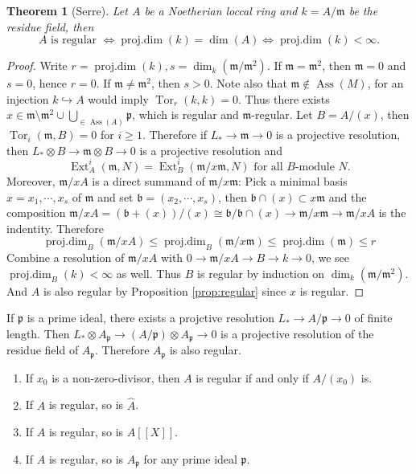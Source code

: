 \documentclass[leqno]{amsart}
\DeclareMathOperator{\Ass}{Ass}
\DeclareMathOperator{\prd}{proj.dim}
\newcommand{\1}{\mathbf{1}}
\newcommand{\fm}{\mathfrak m}
\newcommand{\fp}{\mathfrak p}
\DeclareMathOperator{\Ext}{Ext}
\DeclareMathOperator{\Tor}{Tor}
\newtheorem{thm}{Theorem}[section]
\theoremstyle{definition}
\theoremstyle{remark}
\begin{document}
\begin{thm}[Serre]
	Let $A$ be a Noetherian loccal ring
	and $k=A/\fm$ be the residue field, then
	\[
		A \text{ is regular } \Longleftrightarrow
		\prd(k)=\dim(A) \Longleftrightarrow
		\prd(k)<\infty.
	\]
\end{thm}
\begin{proof}
	Write $r=\prd(k), s=\dim_k(\fm/\fm^2)$.
	If $\fm=\fm^2$, then $\fm=0$ and $s=0$, hence  $r=0$.
	If $\fm\neq \fm^2$, then  $s>0$.
	Note also that  $\fm\notin\Ass(M)$,
	for an injection $k\hookrightarrow A$ 
	would imply $\Tor_r(k,k)=0$.
	Thus there exists 
	$x\in \fm\setminus \fm^2\cup\bigcup_{\in \Ass(A)}\fp$,
	which is regular and $\fm$-regular.
	Let $B=A/(x)$, then
	$\Tor_i(\fm,B)=0$ for  $i\geq 1$.
	Therefore if $L_*\to \fm\to 0$ is a projective resolution,
	then  $L_*\otimes B\to \fm\otimes B\to 0$
	is a projective resolution and
	\[
		\Ext_A^i(\fm,N)=\Ext_B^i(\fm/x\fm, N) 
		\text{ for all $B$-module $N$.}
	\]
	Moreover, $\fm/xA$ is a direct summand of  $\fm/x\fm$:
	Pick a minimal basis $x=x_1,\cdots,x_s$ of $\fm$
	and set $\mathfrak{b}=(x_2,\cdots,x_s)$,
	then $\mathfrak{b}\cap (x)\subset x\fm$ and 
	the composition 
	$\fm/xA=(\mathfrak{b}+(x))/(x)\cong 
	\mathfrak{b}/\mathfrak{b}\cap (x)\to
	\fm/x\fm\to \fm/xA$ is the indentity.
	Therefore
	\[
		\prd_B(\fm/xA)\leq \prd_B(\fm/x\fm)
		\leq \prd(\fm)\leq r
	\]
	Combine a resolution of $\fm/xA$
	with $0\to \fm/xA\to B\to k\to 0$,
	we see $\prd_B(k)<\infty$ as well.
	Thus $B$ is regular by induction on 
	$\dim_k(\fm/\fm^2)$.
	And  $A$ is also regular by Proposition \ref{prop:regular}
	since $x$ is regular.
\end{proof}

If $\fp$ is a prime ideal,
there exists a projctive resolution
$L_*\to A/\fp\to 0$ of finite length.
Then $L_*\otimes A_\fp\to (A/\fp)\otimes A_\fp\to 0$
is a projective resolution of the residue field of $A_\fp$.
Therefore  $A_\fp$ is also regular.

\begin{enumerate}
	\item If $x_0$ is a non-zero-divisor, then
		 $A$ is regular if and only if 
		 $A/(x_0)$ is.
	 \item If $A$ is regular, so is $\hat{A}$.
	 \item If $A$ is regular, so is $A[[X]]$.
	 \item If $A$ is regular, so is $A_\fp$
		 for any prime ideal $\fp$.
\end{enumerate}
\end{document}
